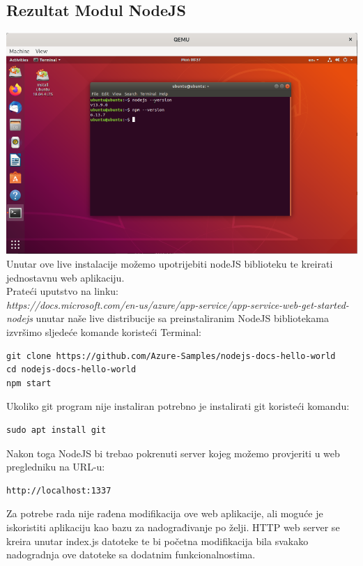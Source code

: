 \documentclass[12pt,vi]{mitthesis}
\begin{document}
\subsection*{Rezultat Modul NodeJS}
\includegraphics[width=\linewidth]{images/ModulNodeJSUbuntu.png} 
Unutar ove live instalacije možemo upotrijebiti nodeJS biblioteku te kreirati jednostavnu web aplikaciju.\\
Prateći uputstvo na linku:\\
\textit{https://docs.microsoft.com/en-us/azure/app-service/app-service-web-get-started-nodejs}
unutar naše live distribucije sa preinstaliranim NodeJS bibliotekama izvršimo sljedeće komande koristeći Terminal:
\begin{lstlisting}[style=BashInputStyle]
git clone https://github.com/Azure-Samples/nodejs-docs-hello-world
cd nodejs-docs-hello-world
npm start
\end{lstlisting}
Ukoliko git program nije instaliran potrebno je instalirati git koristeći komandu:
\begin{lstlisting}[style=BashInputStyle]
sudo apt install git
\end{lstlisting}
Nakon toga NodeJS bi trebao pokrenuti server kojeg možemo provjeriti u web pregledniku na URL-u:
\begin{lstlisting}[style=BashInputStyle]
http://localhost:1337
\end{lstlisting}
Za potrebe rada nije rađena modifikacija ove web aplikacije, ali moguće je iskoristiti aplikaciju kao bazu za nadograđivanje po želji. HTTP web server se kreira unutar index.js datoteke te bi početna modifikacija bila svakako nadogradnja ove datoteke sa dodatnim funkcionalnostima.\\
\end{document}
